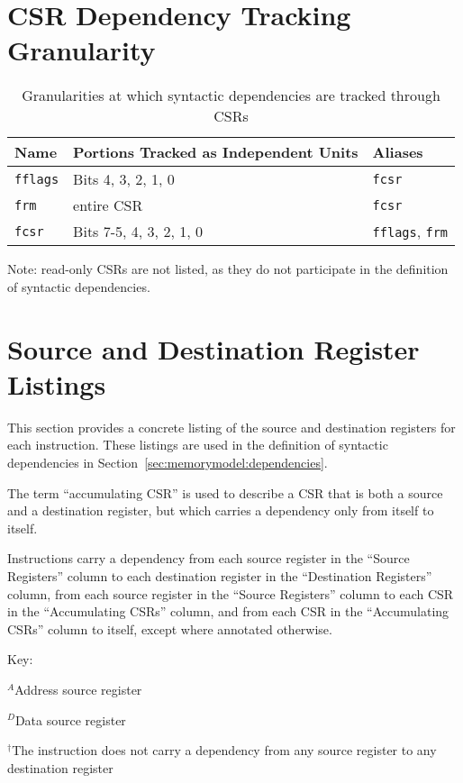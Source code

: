 \section{CSR Dependency Tracking Granularity}
\label{sec:csr-granularity}

\begin{table}[h!]
  \centering
  \begin{tabular}{|l|l|l|}
    \hline
    Name & Portions Tracked as Independent Units & Aliases  \\
    \hline
    {\tt fflags} & Bits 4, 3, 2, 1, 0 & {\tt fcsr}  \\
    \hline
    {\tt frm} & entire CSR & {\tt fcsr} \\
    \hline
    {\tt fcsr} & Bits 7-5, 4, 3, 2, 1, 0 & {\tt fflags}, {\tt frm} \\
    \hline
  \end{tabular}
  \caption{Granularities at which syntactic dependencies are tracked through CSRs}
\end{table}

Note: read-only CSRs are not listed, as they do not participate in the definition of syntactic dependencies.

\section{Source and Destination Register Listings}
\label{sec:source-dest-regs}

This section provides a concrete listing of the source and destination registers for each instruction.
These listings are used in the definition of syntactic dependencies in Section~\ref{sec:memorymodel:dependencies}.

The term ``accumulating CSR'' is used to describe a CSR that is both a source and a destination register, but which carries a dependency only from itself to itself.

Instructions carry a dependency from each source register in the ``Source Registers'' column to each destination register in the ``Destination Registers'' column, from each source register in the ``Source Registers'' column to each CSR in the ``Accumulating CSRs'' column, and from each CSR in the ``Accumulating CSRs'' column to itself, except where annotated otherwise.

Key:

$^A$Address source register

$^D$Data source register

$^\dagger$The instruction does not carry a dependency from any source register to any destination register

